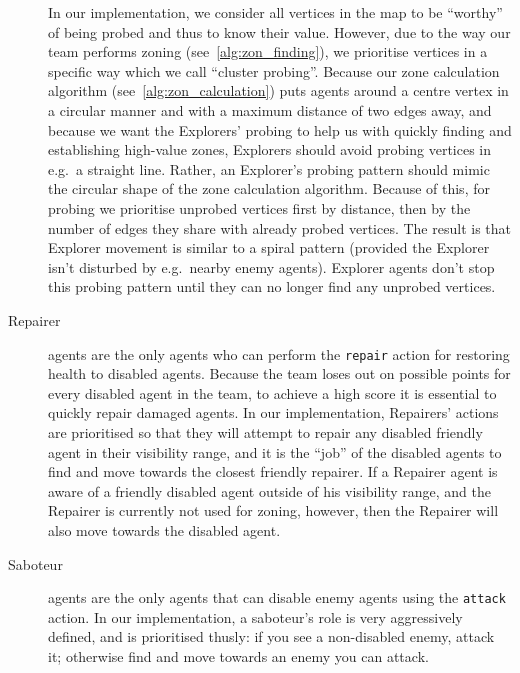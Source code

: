 \begin{description}
        In our implementation, we consider all vertices in the map to be \enquote{worthy} of being probed and thus to know their value.
        However, due to the way our team performs zoning (see~\autoref{alg:zon_finding}), we prioritise vertices in a specific way which we call \enquote{cluster probing}.
        Because our zone calculation algorithm (see~\autoref{alg:zon_calculation}) puts agents around a centre vertex in a circular manner and with a maximum distance of two edges away, and because we want the Explorers' probing to help us with quickly finding and establishing high-value zones, Explorers should avoid probing vertices in e.g.\ a straight line.
        Rather, an Explorer's probing pattern should mimic the circular shape of the zone calculation algorithm.
        Because of this, for probing we prioritise unprobed vertices first by distance, then by the number of edges they share with already probed vertices.
        The result is that Explorer movement is similar to a spiral pattern (provided the Explorer isn't disturbed by e.g.\ nearby enemy agents).
        Explorer agents don't stop this probing pattern until they can no longer find any unprobed vertices.
    \item[Repairer] agents are the only agents who can perform the \texttt{repair} action for restoring health to disabled agents.
        Because the team loses out on possible points for every disabled agent in the team, to achieve a high score it is essential to quickly repair damaged agents.
        In our implementation, Repairers' actions are prioritised so that they will attempt to repair any disabled friendly agent in their visibility range, and it is the \enquote{job} of the disabled agents to find and move towards the closest friendly repairer.
        If a Repairer agent is aware of a friendly disabled agent outside of his visibility range, and the Repairer is currently not used for zoning, however, then the Repairer will also move towards the disabled agent.
    \item[Saboteur] agents are the only agents that can disable enemy agents using the \texttt{attack} action.
        In our implementation, a saboteur's role is very aggressively defined, and is prioritised thusly: if you see a non-disabled enemy, attack it; otherwise find and move towards an enemy you can attack.


\end{description}
